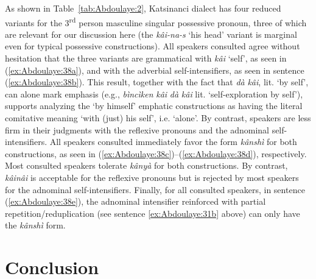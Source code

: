 \documentclass[output=paper]{langscibook}
\begin{document}
As shown in Table~\ref{tab:Abdoulaye:2}, Katsinanci dialect has four reduced variants for the 3\textsuperscript{rd} person masculine singular possessive pronoun, three of which are relevant for our discussion here (the \textit{kâi-na-s} ‘his head’ variant is marginal even for typical possessive constructions). All speakers consulted agree without hesitation that the three variants are grammatical with \textit{kâi} ‘self’, as seen in (\ref{ex:Abdoulaye:38a}), and with the adverbial self-intensifiers, as seen in sentence (\ref{ex:Abdoulaye:38b}). This result, together with the fact that \textit{dà} \textit{kâi}, lit. ‘by self’, can alone mark emphasis (e.g., \textit{bìncìken} \textit{kâi} \textit{dà} \textit{kâi} lit. ‘self-exploration by self’), supports analyzing the ‘by himself’ emphatic constructions as having the literal comitative meaning ‘with (just) his self’, i.e. ‘alone’. By contrast, speakers are less firm in their judgments with the reflexive pronouns and the adnominal self-intensifiers. All speakers consulted immediately favor the form \textit{kânshì} for both constructions, as seen in (\ref{ex:Abdoulaye:38c})--(\ref{ex:Abdoulaye:38d}), respectively. Most consulted speakers tolerate \textit{kânyà} for both constructions. By contrast, \textit{kâinâi} is acceptable for the reflexive pronouns but is rejected by most speakers for the adnominal self-intensifiers. Finally, for all consulted speakers, in sentence (\ref{ex:Abdoulaye:38e}), the adnominal intensifier reinforced with partial repetition/reduplication (see sentence \ref{ex:Abdoulaye:31b} above) can only have the \textit{kânshì} form.


\section{Conclusion} \label{sec:Abdoulaye:8}
\end{document}
